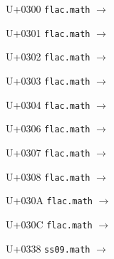 \documentclass{article}
\begin{document}
\begin{substitutions}

U+0300  \linebreak
    \texttt{flac.math} $\to$  

\goodbreak

U+0301  \linebreak
    \texttt{flac.math} $\to$  

\goodbreak

U+0302  \linebreak
    \texttt{flac.math} $\to$  

\goodbreak

U+0303  \linebreak
    \texttt{flac.math} $\to$  

\goodbreak

U+0304  \linebreak
    \texttt{flac.math} $\to$  

\goodbreak

U+0306  \linebreak
    \texttt{flac.math} $\to$  

\goodbreak

U+0307  \linebreak
    \texttt{flac.math} $\to$  

\goodbreak

U+0308  \linebreak
    \texttt{flac.math} $\to$  

\goodbreak

U+030A  \linebreak
    \texttt{flac.math} $\to$  

\goodbreak

U+030C  \linebreak
    \texttt{flac.math} $\to$  

\goodbreak

U+0338  \linebreak
    \texttt{ss09.math} $\to$  

\goodbreak

\end{substitutions}

\clearpage
\end{document}
